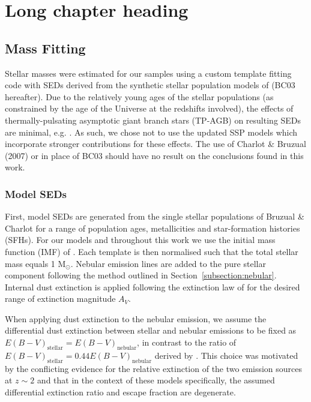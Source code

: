 
\chapter[Sample Selection]{Long chapter heading} 
\label{ch:chapter2_label}

\section{Mass Fitting}\label{sec:masses}
Stellar masses were estimated for our samples using a custom template fitting code with SEDs derived from the synthetic stellar population models of \citet{Bruzual:2003ckb} (BC03 hereafter). Due to the relatively young ages of the stellar populations (as constrained by the age of the Universe at the redshifts involved), the effects of thermally-pulsating asymptotic giant branch stars (TP-AGB) on resulting SEDs are minimal, e.g. \citet{2009ApJ...697.1493S}. As such, we chose not to use the updated SSP models which incorporate stronger contributions for these effects. The use of Charlot \& Bruzual (2007) or \citet{Maraston:2005er} in place of BC03 should have no result on the conclusions found in this work.


\subsection{Model SEDs}\label{subsec:seds}
First, model SEDs are generated from the single stellar populations of Bruzual \& Charlot for a range of population ages, metallicities and star-formation histories (SFHs). For our models and throughout this work we use the initial mass function (IMF) of \citet{Chabrier:2003ki}. Each template is then normalised such that the total stellar mass equals 1 M$_{\odot}$. Nebular emission lines are added to the pure stellar component following the method outlined in Section~\ref{subsection:nebular}. Internal dust extinction is applied following the extinction law of \citet{2000ApJ...533..682C} for the desired range of extinction magnitude $A_{V}$.

When applying dust extinction to the nebular emission, we assume the differential dust extinction between stellar and nebular emissions to be fixed as $E(B-V)_{\text{stellar}} = E(B-V)_{\text{nebular}}$, in contrast to the ratio of $E(B-V)_{\text{stellar}} = 0.44 E(B-V)_{\text{nebular}}$ derived by \citet{2000ApJ...533..682C}. This choice was motivated by the conflicting evidence for the relative extinction of the two emission sources at $z \sim 2$ \citep{Erb:2006ke,ForsterSchreiber:2009hm} and that in the context of these models specifically, the assumed differential extinction ratio and escape fraction are degenerate.

